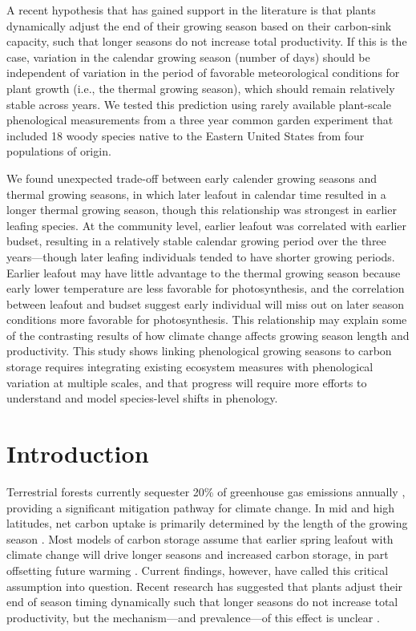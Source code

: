 \documentclass{article}[12pt]
\begin{document}
A recent hypothesis that has gained support in the literature is that plants dynamically adjust the end of their growing season based on their carbon-sink capacity, such that longer seasons do not increase total productivity. If this is the case, variation in the calendar growing season (number of days) should be independent of variation in the period of favorable meteorological conditions for plant growth (i.e., the thermal growing season), which should remain relatively stable across years. We tested this prediction using rarely available plant-scale phenological measurements from a three year common garden experiment that included 18 woody species native to the Eastern United States from four populations of origin. 

 We found unexpected trade-off between early calender growing seasons and thermal growing seasons, in which later leafout in calendar time resulted in a longer thermal growing season, though this relationship was strongest in earlier leafing species. At the community level, earlier leafout was correlated with earlier budset, resulting in a relatively stable calendar growing period over the three years---though later leafing individuals tended to have shorter growing periods. Earlier leafout may have little advantage to the thermal growing season because early lower temperature are less favorable for photosynthesis, and the correlation between leafout and budset suggest early individual will miss out on later season conditions more favorable for photosynthesis. This relationship may explain some of the contrasting results of how climate change affects growing season length and productivity. This study shows linking phenological growing seasons to carbon storage requires integrating existing ecosystem measures with phenological variation at multiple scales, and that progress will require more efforts to understand and model species-level shifts in phenology.

\section{Introduction}
Terrestrial forests currently sequester 20\% of greenhouse gas emissions annually  \citep{shanley2024, roe2021}, providing a significant mitigation pathway for climate change. In mid and high latitudes, net carbon uptake is primarily determined by the length of the growing season \citep{White1999}. Most models of carbon storage assume that earlier spring leafout with climate change will drive longer seasons and increased carbon storage, in part offsetting future warming \citep{Churkina2005,White1999,Keenan2014}. Current findings, however, have called this critical assumption into question. Recent research has suggested that plants adjust their end of season timing dynamically such that longer seasons do not increase total productivity, but the mechanism---and prevalence---of this effect is unclear \citep{Zani2020,Norby2021,Zohner2023}.
\end{document}
